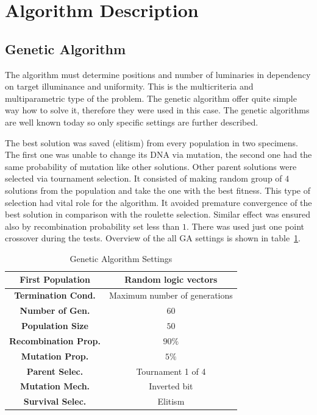 \section{Algorithm Description}
\subsection{Genetic Algorithm}
\label{ssec:GenAlg}
The algorithm must determine positions and number of luminaries in dependency on target illuminance and uniformity. This is the multicriteria and multiparametric type of the problem. The genetic algorithm offer quite simple way how to solve it, therefore they were used in this case. The genetic algorithms are well known today so only specific settings are further described.

The best solution was saved (elitism) from every population in two specimens. The first one was unable to change its DNA via mutation, the second one had the same probability of mutation like other solutions. Other parent solutions were selected via tournament selection. It consisted of making random group of $4$ solutions from the population and take the one with the best fitness. This type of selection had vital role for the algorithm. It avoided premature convergence of the best solution in comparison with the roulette selection. Similar effect was ensured also by recombination probability set less than $1$. There was used just one point crossover during the tests. Overview of the all GA settings is shown in table~\ref{tab:GAsettings}.

\begin{table}[htb]
	\renewcommand{\arraystretch}{1.3}
	\caption{Genetic Algorithm Settings}
 	\label{tab:GAsettings}
	\centering
  \begin{tabular}{| c | c |}
    \hline
    \textbf{First Population} & Random logic vectors \\
    \hline
    \textbf{Termination Cond.} & Maximum number of generations \\
    \hline
		\textbf{Number of Gen.} & $60$ \\
    \hline
		\textbf{Population Size} & $50$ \\
    \hline
		\textbf{Recombination Prop.} & $90 \%$ \\
    \hline
		\textbf{Mutation Prop.} & $5 \%$ \\
    \hline
		\textbf{Parent Selec.} & Tournament 1 of 4 \\
    \hline
		\textbf{Mutation Mech.} & Inverted bit \\
    \hline
		\textbf{Survival Selec.} & Elitism \\
    \hline
  \end{tabular}
\end{table}

